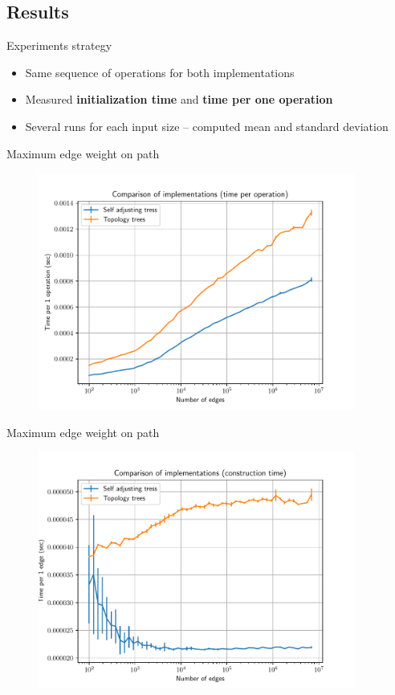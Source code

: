 \documentclass{beamer}				%
\begin{document}
\subsection{Results}

\begin{frame}{Experiments strategy}
\begin{itemize}
\item Same sequence of operations for both implementations
\item Measured {\bf initialization time} and {\bf time per one operation}
\item Several runs for each input size -- computed mean and standard deviation
\end{itemize}
\end{frame}

\begin{frame}{Maximum edge weight on path}
	\vskip -3mm
	\begin{figure}
	\centering
	\includegraphics[width=10.4cm]{../charts/maximum_edge_weight_op.pdf}
	\end{figure}
\end{frame}

\begin{frame}{Maximum edge weight on path}
	\vskip -3mm
	\begin{figure}
	\centering
	\includegraphics[width=10.4cm]{../charts/maximum_edge_weight_construction.pdf}
	\end{figure}
\end{frame}
\end{document}
